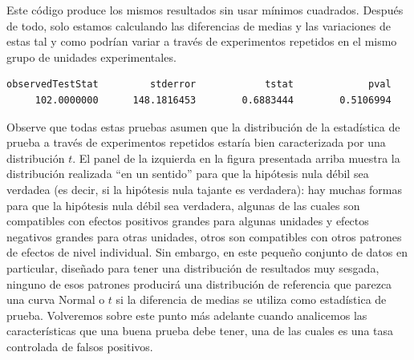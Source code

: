 \documentclass[
]{article}
\newenvironment{Shaded}{\begin{snugshade}}{\end{snugshade}}
\newcommand{\AttributeTok}[1]{\textcolor[rgb]{0.77,0.63,0.00}{#1}}
\newcommand{\ConstantTok}[1]{\textcolor[rgb]{0.00,0.00,0.00}{#1}}
\newcommand{\ControlFlowTok}[1]{\textcolor[rgb]{0.13,0.29,0.53}{\textbf{#1}}}
\newcommand{\DecValTok}[1]{\textcolor[rgb]{0.00,0.00,0.81}{#1}}
\newcommand{\FunctionTok}[1]{\textcolor[rgb]{0.00,0.00,0.00}{#1}}
\newcommand{\NormalTok}[1]{#1}
\newcommand{\OtherTok}[1]{\textcolor[rgb]{0.56,0.35,0.01}{#1}}
\newcommand{\SpecialCharTok}[1]{\textcolor[rgb]{0.00,0.00,0.00}{#1}}
\begin{document}
Este código produce los mismos resultados sin usar mínimos cuadrados. Después de todo, solo estamos calculando las diferencias de medias y las variaciones de estas tal y como podrían variar a través de experimentos repetidos en el mismo grupo de unidades experimentales.

\begin{Shaded}
\end{Shaded}

\begin{verbatim}
observedTestStat         stderror            tstat             pval 
     102.0000000      148.1816453        0.6883444        0.5106994 
\end{verbatim}

Observe que todas estas pruebas asumen que la distribución de la estadística de prueba a través de experimentos repetidos estaría bien caracterizada por una distribución \(t\). El panel de la izquierda en la figura presentada arriba muestra la distribución realizada ``en un sentido'' para que la hipótesis nula débil sea verdadea (es decir, si la hipótesis nula tajante es verdadera): hay muchas formas para que la hipótesis nula débil sea verdadera, algunas de las cuales son compatibles con efectos positivos grandes para algunas unidades y efectos negativos grandes para otras unidades, otros son compatibles con otros patrones de efectos de nivel individual. Sin embargo, en este pequeño conjunto de datos en particular, diseñado para tener una distribución de resultados muy sesgada, ninguno de esos patrones producirá una distribución de referencia que parezca una curva Normal o \(t\) si la diferencia de medias se utiliza como estadística de prueba. Volveremos sobre este punto más adelante cuando analicemos las características que una buena prueba debe tener, una de las cuales es una tasa controlada de falsos positivos.
\end{document}
